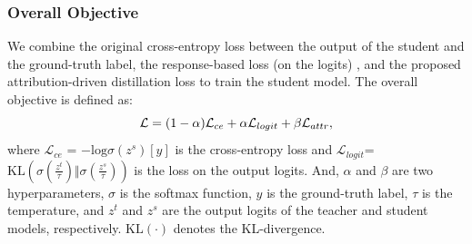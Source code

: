 \documentclass[11pt]{article}
\begin{document}
\subsubsection{Overall Objective}
We combine the original cross-entropy loss between the output of the student and the ground-truth label, the response-based loss (on the logits) \cite{hinton2015distilling}, and the proposed attribution-driven distillation loss to train the student model. The overall objective is defined as:
\begin{equation}
\small
     \mathcal{L} = (1-\alpha) \mathcal{L}_{ce} + \alpha \mathcal{L}_{logit} + \beta \mathcal{L}_{attr},
\end{equation}
where $\mathcal{L}_{ce}$ = $-\text{log}\sigma(z^s)[y]$ is the cross-entropy loss and $\mathcal{L}_{logit}$=$\text{KL}(\sigma(\frac{z^t}{\tau}) \Vert \sigma(\frac{z^s}{\tau}))$ is the loss on the output logits. And, $\alpha$ and $\beta$ are two hyperparameters, $\sigma$ is the softmax function, $y$ is the ground-truth label, $\tau$ is the temperature, and $z^t$ and $z^s$ are the output logits of the teacher and student models, respectively. $\text{KL}(\cdot)$ denotes the KL-divergence.
\end{document}

